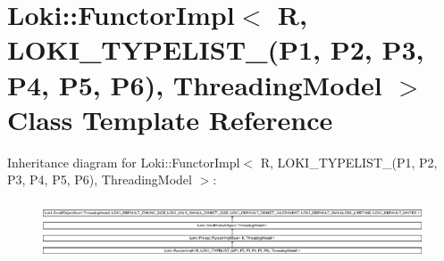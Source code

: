 \hypertarget{classLoki_1_1FunctorImpl_3_01R_00_01LOKI__TYPELIST__6_07P1_00_01P2_00_01P3_00_01P4_00_01P5_00_01P6_08_00_01ThreadingModel_01_4}{}\section{Loki\+:\+:Functor\+Impl$<$ R, L\+O\+K\+I\+\_\+\+T\+Y\+P\+E\+L\+I\+S\+T\+\_(P1, P2, P3, P4, P5, P6), Threading\+Model $>$ Class Template Reference}
\label{classLoki_1_1FunctorImpl_3_01R_00_01LOKI__TYPELIST__6_07P1_00_01P2_00_01P3_00_01P4_00_01P5_00_01P6_08_00_01ThreadingModel_01_4}
Inheritance diagram for Loki\+:\+:Functor\+Impl$<$ R, L\+O\+K\+I\+\_\+\+T\+Y\+P\+E\+L\+I\+S\+T\+\_(P1, P2, P3, P4, P5, P6), Threading\+Model $>$\+:\begin{figure}[H]
\begin{center}
\leavevmode
\includegraphics[height=1.751368cm]{classLoki_1_1FunctorImpl_3_01R_00_01LOKI__TYPELIST__6_07P1_00_01P2_00_01P3_00_01P4_00_01P5_00_01P6_08_00_01ThreadingModel_01_4}
\end{center}
\end{figure}
